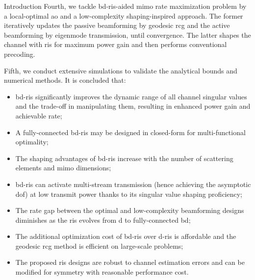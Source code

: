 \documentclass[journal]{IEEEtran}
\begin{document}
\begin{section}{Introduction}
		Fourth, we tackle \gls{bd}-\gls{ris}-aided \gls{mimo} rate maximization problem by a local-optimal \gls{ao} and a low-complexity shaping-inspired approach.
		The former iteratively updates the passive beamforming by geodesic \gls{rcg} and the active beamforming by eigenmode transmission, until convergence.
		The latter shapes the channel with \gls{ris} for maximum power gain and then performs conventional precoding.

		Fifth, we conduct extensive simulations to validate the analytical bounds and numerical methods.
		It is concluded that:
		\begin{itemize}
			\item \gls{bd}-\gls{ris} significantly improves the dynamic range of all channel singular values and the trade-off in manipulating them, resulting in enhanced power gain and achievable rate;
			\item A fully-connected \gls{bd}-\gls{ris} may be designed in closed-form for multi-functional optimality;
			\item The shaping advantages of \gls{bd}-\gls{ris} increase with the number of scattering elements and \gls{mimo} dimensions;
			\item \gls{bd}-\gls{ris} can activate multi-stream transmission (hence achieving the asymptotic \gls{dof}) at low transmit power thanks to its singular value shaping proficiency;
			\item The rate gap between the optimal and low-complexity beamforming designs diminishes as the \gls{ris} evolves from \gls{d} to fully-connected \gls{bd};
			\item The additional optimization cost of \gls{bd}-\gls{ris} over \gls{d}-\gls{ris} is affordable and the geodesic \gls{rcg} method is efficient on large-scale problems;
			\item The proposed \gls{ris} designs are robust to channel estimation errors and can be modified for symmetry with reasonable performance cost.
		\end{itemize}


\end{section}
\end{document}
